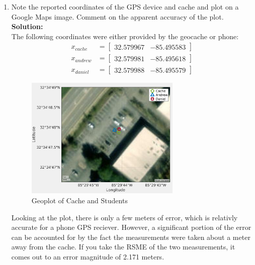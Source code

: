 \documentclass[11pt]{article}
\newcommand{\solution}{\textbf{\\Solution: \\}}
\begin{document}
\begin{enumerate}[label=\textbf{\arabic*.}]
  \itemsep 36pt
  \item Note the reported coordinates of the GPS device and cache and 
  plot on a Google Maps image. Comment on the apparent accuracy of the
  plot.
  \solution
  The following coordinates were either provided by the geocache or phone:
  \begin{equation*}
    \begin{split}
      x_{cache} &=
      \begin{bmatrix}
        32.579967 & -85.495583
      \end{bmatrix}
      \\ x_{andrew} &=
      \begin{bmatrix}
        32.579981 & -85.495618
      \end{bmatrix}
      \\ x_{daniel} &=
      \begin{bmatrix}
        32.579988 & -85.495579
      \end{bmatrix}
    \end{split}
  \end{equation*}
  \begin{figure}[H]
    \centering
    \includegraphics[width=0.7\textwidth]{p1.png}
    \caption{Geoplot of Cache and Students}
  \end{figure}
  Looking at the plot, there is only a few meters of error, which is 
  relativly accurate for a phone GPS reciever. However, a significant 
  portion of the error can be accounted for by the fact the measurements 
  were taken about a meter away from the cache. If you take the RSME of 
  the two measurements, it comes out to an error magnitude of 2.171 meters.


\end{enumerate}
\end{document}
